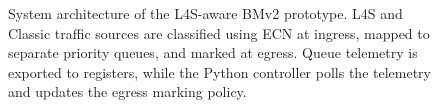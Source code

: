 \begin{figure}[t]
{%
}
\caption{System architecture of the L4S-aware BMv2 prototype. L4S and Classic traffic sources are classified using ECN at ingress, mapped to separate priority queues, and marked at egress. Queue telemetry is exported to registers, while the Python controller polls the telemetry and updates the egress marking policy.}
\label{fig:system-architecture}
\end{figure}
